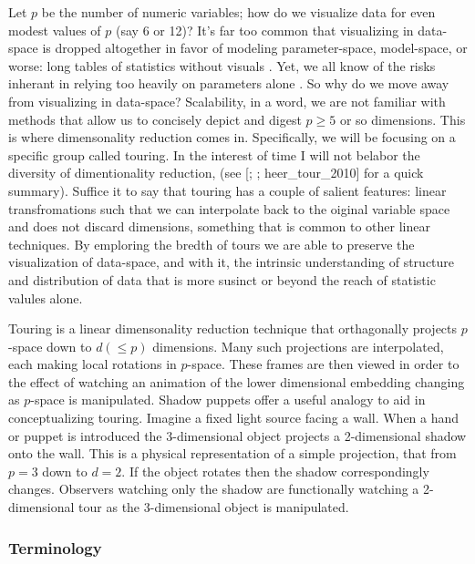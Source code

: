 \documentclass{monashthesis}
\begin{document}
Let \(p\) be the number of numeric variables; how do we visualize data
for even modest values of \(p\) (say 6 or 12)? It's far too common that
visualizing in data-space is dropped altogether in favor of modeling
parameter-space, model-space, or worse: long tables of statistics
without visuals \autocite{wickham_visualizing_2015}. Yet, we all know of
the risks inherant in relying too heavily on parameters alone
\autocites{anscombe_graphs_1973}{matejka_same_2017}. So why do we move
away from visualizing in data-space? Scalability, in a word, we are not
familiar with methods that allow us to concisely depict and digest
\(p \geq 5\) or so dimensions. This is where dimensonality reduction
comes in. Specifically, we will be focusing on a specific group called
touring. In the interest of time I will not belabor the diversity of
dimentionality reduction, (see
{[}\textcite{grinstein_high-dimensional_2002};
\textcite{carreira-perpinan_review_1997}; heer\_tour\_2010{]} for a
quick summary). Suffice it to say that touring has a couple of salient
features: linear transfromations such that we can interpolate back to
the oiginal variable space and does not discard dimensions, something
that is common to other linear techniques. By emploring the bredth of
tours we are able to preserve the visualization of data-space, and with
it, the intrinsic understanding of structure and distribution of data
that is more susinct or beyond the reach of statistic valules alone.

Touring is a linear dimensonality reduction technique that orthagonally
projects \(p\)-space down to \(d(\leq p)\) dimensions. Many such
projections are interpolated, each making local rotations in
\(p\)-space. These frames are then viewed in order to the effect of
watching an animation of the lower dimensional embedding changing as
\(p\)-space is manipulated. Shadow puppets offer a useful analogy to aid
in conceptualizing touring. Imagine a fixed light source facing a wall.
When a hand or puppet is introduced the 3-dimensional object projects a
2-dimensional shadow onto the wall. This is a physical representation of
a simple projection, that from \(p=3\) down to \(d=2\). If the object
rotates then the shadow correspondingly changes. Observers watching only
the shadow are functionally watching a 2-dimensional tour as the
3-dimensional object is manipulated.

\subsubsection{Terminology}\label{terminology}
\end{document}
